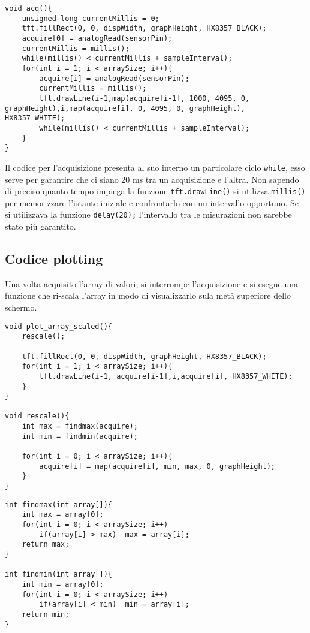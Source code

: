 \clearpage
\begin{lstlisting}[frame=single, language=Arduino]
void acq(){
    unsigned long currentMillis = 0;
    tft.fillRect(0, 0, dispWidth, graphHeight, HX8357_BLACK);
    acquire[0] = analogRead(sensorPin);
    currentMillis = millis();
    while(millis() < currentMillis + sampleInterval);
    for(int i = 1; i < arraySize; i++){
        acquire[i] = analogRead(sensorPin);
        currentMillis = millis();
        tft.drawLine(i-1,map(acquire[i-1], 1000, 4095, 0, graphHeight),i,map(acquire[i], 0, 4095, 0, graphHeight), HX8357_WHITE);
        while(millis() < currentMillis + sampleInterval);
    }
}
\end{lstlisting}
Il codice per l'acquisizione presenta al suo interno un particolare ciclo \texttt{while}, esso serve per garantire che ci siano 20 ms tra un acquisizione e l'altra. Non sapendo di preciso quanto tempo impiega la funzione \texttt{tft.drawLine()}  si utilizza \texttt{millis()} per memorizzare l'istante iniziale e confrontarlo con un intervallo opportuno. Se si utilizzava la funzione \texttt{delay(20);} l'intervallo tra le misurazioni non sarebbe stato più garantito. 
\subsection{Codice plotting}
Una volta acquisito l’array di valori, si interrompe l’acquisizione e si esegue una funzione che ri-scala l’array in modo di visualizzarlo sula metà superiore dello schermo.
\begin{lstlisting}[frame=single, language=Arduino]
void plot_array_scaled(){
    rescale();
    
    tft.fillRect(0, 0, dispWidth, graphHeight, HX8357_BLACK);
    for(int i = 1; i < arraySize; i++){
        tft.drawLine(i-1, acquire[i-1],i,acquire[i], HX8357_WHITE);
    }
}

void rescale(){
    int max = findmax(acquire);
    int min = findmin(acquire);
    
    for(int i = 0; i < arraySize; i++){
        acquire[i] = map(acquire[i], min, max, 0, graphHeight);
    }
}
\end{lstlisting}
\clearpage
\begin{lstlisting}[frame=single, language=Arduino]
int findmax(int array[]){
    int max = array[0];
    for(int i = 0; i < arraySize; i++)
        if(array[i] > max)  max = array[i];
    return max;
}

int findmin(int array[]){
    int min = array[0];
    for(int i = 0; i < arraySize; i++)
        if(array[i] < min)  min = array[i];
    return min;
}
\end{lstlisting}